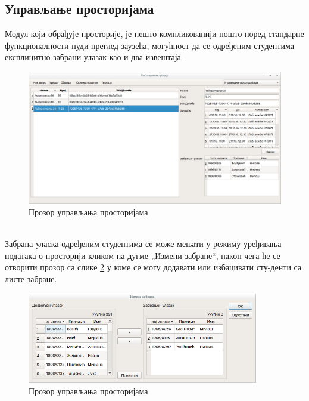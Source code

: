 \documentclass[a4paper, 12pt, diplomski]{etfcyr}
\def\quote#1{„#1“}
\begin{document}
			\subsection{Управљање просторијама}
				\begin{justify}
					Модул који обрађује просторије, је нешто компликованији пошто поред стандарне функционалности нуди преглед заузећа, могућност да се одређеним студентима експлицитно забрани улазак као и два извештаја.
					\begin{figure}[h]
						\begin{center}
							\includegraphics[width=1\textwidth]{manual/rooms_main_window.png}
						\end{center}
						\caption{Прозор управљања просторијама}
						\label{figure:rooms_main_window}
					\end{figure}\\
					Забрана уласка одређеним студентима се може мењати у режиму уређивања података о просторији кликом на дугме \quote{Измени забране}, након чега ће се отворити прозор са слике \ref{figure:room_bans} у коме се могу додавати или избацивати сту-денти са листе забране.
					\begin{figure}[h]
						\begin{center}
							\includegraphics[width=0.9\textwidth]{manual/room_bans.png}
						\end{center}
						\caption{Прозор управљања просторијама}
						\label{figure:room_bans}
					\end{figure}


\end{justify}
\end{document}
